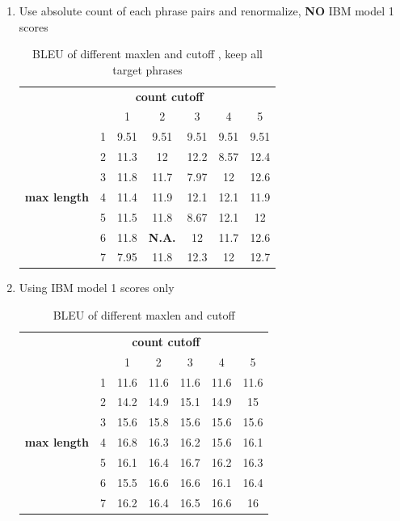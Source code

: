\documentclass[11pt, letterpaper]{article}   	%
\begin{document}
\begin{enumerate}
\begin{enumerate}
\item Use absolute count of each phrase pairs and renormalize, \textbf{NO} IBM model 1 scores
\begin{table}[H]
\centering
\begin{tabular}{ c c | c | c | c | c|c }
& \multicolumn{5}{c}{\bf{ count cutoff}}  \\
&  & 1 &	2 &	3 &	4 &	5\\
\hline
\multirow{7}{*}{\bf{max length}}
& 1 &	9.51 &	9.51 &	9.51 &	9.51 &	9.51\\
\cline{2-7}
& 2 &	11.3 &	12 &	12.2 &	8.57 &	12.4\\
\cline{2-7}
& 3 &	11.8 &	11.7 &	7.97 &	12 &	12.6\\
\cline{2-7}
& 4 &	11.4 &	11.9 &	12.1 &	12.1 &	11.9\\
\cline{2-7}
& 5 &	11.5 &	11.8 &	8.67 &	12.1 &	12\\
\cline{2-7}
& 6 &	11.8 &	\bf{N.A.} &	12 &	11.7 &	12.6\\
\cline{2-7}
& 7 &	7.95 &	11.8 &	12.3 &	12 &	12.7\\
\hline
\end{tabular}
\label{tab:countonly}
\caption{BLEU of different maxlen and cutoff , keep all target phrases}
\end{table}

\item Using IBM model 1 scores only

\begin{table}[H]
\centering
\begin{tabular}{ c c | c | c | c | c|c }
& \multicolumn{5}{c}{\bf{ count cutoff}}  \\
&  & 1 &	2 &	3 &	4 &	5\\
\hline
\multirow{7}{*}{\bf{max length}}
& 1 &	11.6 &	11.6 &	11.6 &	11.6 &	11.6\\
\cline{2-7}
& 2 &	14.2 &	14.9 &	15.1 &	14.9 &	15\\
\cline{2-7}
& 3 &	15.6 &	15.8 &	15.6 &	15.6 &	15.6\\
\cline{2-7}
& 4 &	16.8 &	16.3 &	16.2 &	15.6 &	16.1\\
\cline{2-7}
& 5 &	16.1 &	16.4 &	16.7 &	16.2 &	16.3\\
\cline{2-7}
& 6 &	15.5 &	16.6 &	16.6 &	16.1 &	16.4\\
\cline{2-7}
& 7 &	16.2 &	16.4 &	16.5 &	16.6 &	16\\
\hline
\end{tabular}

\label{tab:lexonly}
\caption{BLEU of different maxlen and cutoff }
\end{table}
\end {enumerate}


\end{enumerate}
\end{document}
